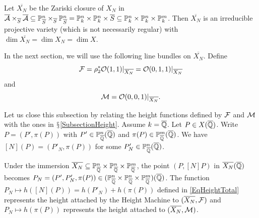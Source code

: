 Let $\overline{X_N}$ be the Zariski closure of $X_N$ in
$\overline{\mathcal{A}}\times_{\overline{S}}\overline{\mathcal{A}}\subseteq
{\mathbb{P}}^n_{\overline{S}}\times_{\overline{S}}{\mathbb{P}}^n_{\overline{S}} =
{\mathbb{P}}_k^n\times{\mathbb{P}}_k^n\times \overline{S}
\subseteq{\mathbb{P}}_k^n\times{\mathbb{P}}_k^n\times {\mathbb{P}}_k^m$.  Then $\overline{X_N}$ is an irreducible projective variety (which is not necessarily regular) with $\dim \overline{X_N} = \dim X_N = \dim X$.

In the next section, we will use the following line bundles on $\overline{X_N}$. Define
\begin{equation}\label{def:cF}
{\mathcal F} = \rho_2^*{\mathcal O}(1,1)|_{\overline{X_N}} = {\mathcal O}(0,1,1)|_{\overline{X_N}}
\end{equation}
and
\begin{equation}\label{def:cM}
  \cM %
  = \cO(0,0,1)|_{\overline{X_N}}.
\end{equation}

Let us close this subsection by relating the height functions defined
by ${\mathcal F}$ and ${\mathcal M}$ with the ones in
$\mathsection$\ref{SubsectionHeight}. Assume $k = {\overline{\mathbb{Q}}}$. Let $P \in
X({\overline{\mathbb{Q}}})$. Write $P = (P',\pi(P))$ with
 $P' \in {\mathbb{P}}_{\overline{\mathbb{Q}}}^n({\overline{\mathbb{Q}}})$ and $\pi(P) \in{\mathbb{P}}_{\overline{\mathbb{Q}}}^m({\overline{\mathbb{Q}}})$. %
We have $[N](P) = ( P'_N,\pi(P))$ for some $P'_N \in {\mathbb{P}}_{\overline{\mathbb{Q}}}^n({\overline{\mathbb{Q}}})$.

Under the immersion $\overline{X_N} \subseteq {\mathbb{P}}_{\overline{\mathbb{Q}}}^n \times
{\mathbb{P}}_{\overline{\mathbb{Q}}}^n \times {\mathbb{P}}_{\overline{\mathbb{Q}}}^m$, the point $(P,[N]P)$ in
$\overline{X_N}({\overline{\mathbb{Q}}})$ becomes $P_N=(P',P'_N,\pi(P)) \in
({\mathbb{P}}_{\overline{\mathbb{Q}}}^n \times {\mathbb{P}}_{\overline{\mathbb{Q}}}^n \times {\mathbb{P}}_{\overline{\mathbb{Q}}}^m)({\overline{\mathbb{Q}}})$.
The function $P_N\mapsto h([N](P)) = h(P'_N)+h(\pi(P))$ defined in
\eqref{EqHeightTotal}
represents the height attached by the Height Machine to
$(\overline{X_N},{\mathcal F})$
and $P_N\mapsto h(\pi(P))$ represents the height attached to $(\overline{X_N},{\mathcal M})$.


